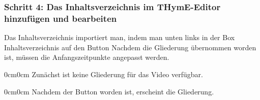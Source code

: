 \documentclass[parskip=off,index=totocnumbered]{scrartcl}
\newenvironment{rückkeinstück}
	{\begin{adjustwidth}{0cm}{0cm}\footnotesize \singlespace \centering} 
	{\end{adjustwidth} \onehalfspacing}
\begin{document}
                           
\subsubsection*{Schritt 4: Das Inhaltsverzeichnis im THymE-Editor hinzufügen und bearbeiten}
Das Inhaltsverzeichnis importiert man, indem man unten links in der Box \textsf{Inhaltsverzeichnis} auf den Button  Nachdem die Gliederung übernommen worden ist, müssen die Anfangszeitpunkte angepasst werden.
              
\noindent \begin{minipage}{\textwidth}
    \vspace{0.6cm}
    \begin{rückkeinstück}
        Zunächst ist keine Gliederung für das Video verfügbar.
    \end{rückkeinstück}
\end{minipage}
              
\noindent \begin{minipage}{\textwidth}
    \begin{rückkeinstück}
        Nachdem der Button  worden ist, erscheint die Gliederung.
    \end{rückkeinstück}
\end{minipage}
\end{document}
